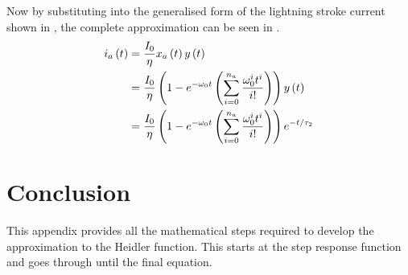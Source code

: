 Now by substituting into the generalised form of the lightning stroke current shown in , the complete approximation can be seen in .
\begin{align}
    i_a \left( t \right) & = \frac{I_0}{\eta} x_a \left( t \right) y \left( t \right) \label{eqn:app_eqn_small} \\
    & = \frac{I_0}{\eta} \left ( 1 - e^{-\omega_0 t} \left ( \sum\limits_{i=0}^{n_a} \frac{\omega_0^i t^i}{i!} \right ) \right ) y \left( t \right) \notag\\
    & = \frac{I_0}{\eta} \left ( 1 - e^{-\omega_0 t} \left ( \sum\limits_{i=0}^{n_a} \frac{\omega_0^i t^i}{i!} \right ) \right ) e^{-t/\tau_2}
    \label{eqn:app_approx}
\end{align}


\section{Conclusion}
\label{sec:app_dev_conclusion}
This appendix provides all the mathematical steps required to develop the approximation to the Heidler function. This starts at the step response function and goes through until the final equation.
